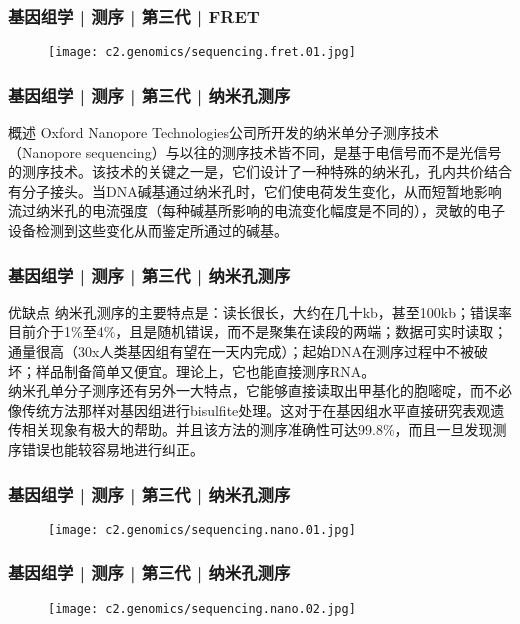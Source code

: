 \begin{frame}
  \frametitle{基因组学 | 测序 | 第三代 | FRET}
  \begin{figure}
    \centering
    \texttt{[image: c2.genomics/sequencing.fret.01.jpg]}
  \end{figure}
\end{frame}

\begin{frame}
  \frametitle{基因组学 | 测序 | 第三代 | 纳米孔测序}
  \begin{block}{概述}
Oxford Nanopore Technologies公司所开发的纳米单分子测序技术（Nanopore sequencing）与以往的测序技术皆不同，是基于电信号而不是光信号的测序技术。该技术的关键之一是，它们设计了一种特殊的纳米孔，孔内共价结合有分子接头。当DNA碱基通过纳米孔时，它们使电荷发生变化，从而短暂地影响流过纳米孔的电流强度（每种碱基所影响的电流变化幅度是不同的），灵敏的电子设备检测到这些变化从而鉴定所通过的碱基。
  \end{block}
\end{frame}

\begin{frame}
  \frametitle{基因组学 | 测序 | 第三代 | 纳米孔测序}
  \begin{block}{优缺点}
纳米孔测序的主要特点是：读长很长，大约在几十kb，甚至100kb；错误率目前介于1\%至4\%，且是随机错误，而不是聚集在读段的两端；数据可实时读取；通量很高（30x人类基因组有望在一天内完成）；起始DNA在测序过程中不被破坏；样品制备简单又便宜。理论上，它也能直接测序RNA。\\
\vspace{1em}
纳米孔单分子测序还有另外一大特点，它能够直接读取出甲基化的胞嘧啶，而不必像传统方法那样对基因组进行bisulfite处理。这对于在基因组水平直接研究表观遗传相关现象有极大的帮助。并且该方法的测序准确性可达99.8\%，而且一旦发现测序错误也能较容易地进行纠正。
  \end{block}
\end{frame}

\begin{frame}
  \frametitle{基因组学 | 测序 | 第三代 | 纳米孔测序}
  \begin{figure}
    \centering
    \texttt{[image: c2.genomics/sequencing.nano.01.jpg]}
  \end{figure}
\end{frame}

\begin{frame}
  \frametitle{基因组学 | 测序 | 第三代 | 纳米孔测序}
  \begin{figure}
    \centering
    \texttt{[image: c2.genomics/sequencing.nano.02.jpg]}
  \end{figure}
\end{frame}

